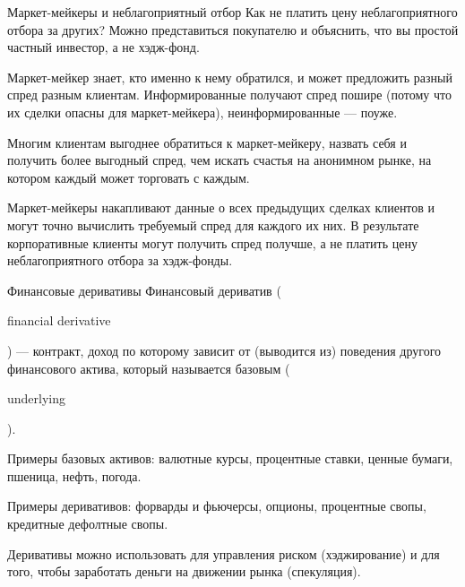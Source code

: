 \documentclass{beamer}
\newcommand{\en}[1]{\begin{otherlanguage}{english}#1\end{otherlanguage}}
\begin{document}
\begin{frame}{Маркет-мейкеры и неблагоприятный отбор}
\justify
Как не платить цену неблагоприятного отбора за других? Можно 
представиться покупателю и объяснить, что вы простой частный инвестор, а не хэдж-фонд.

\justify
Маркет-мейкер знает, кто именно к нему обратился, и может предложить разный спред разным клиентам. Информированные получают спред пошире (потому что их сделки опасны для маркет-мейкера), неинформированные --- поуже.

\justify
Многим клиентам выгоднее обратиться к маркет-мейкеру, назвать себя и 
получить более выгодный спред, чем искать счастья на анонимном рынке, на котором
каждый может торговать с каждым.

\justify
Маркет-мейкеры накапливают данные о всех предыдущих сделках клиентов и
могут точно вычислить требуемый спред для каждого их них. В результате корпоративные клиенты могут получить спред получше, а не платить цену неблагоприятного отбора за хэдж-фонды.
\end{frame}



\begin{frame}{Финансовые деривативы}
\justify
\alert{Финансовый дериватив} (\en{financial derivative}) --- контракт, доход по которому зависит 
от (выводится из) поведения другого финансового актива, который называется базовым 
(\en{underlying}).

\justify
Примеры базовых активов: валютные курсы, процентные ставки, ценные бумаги, пшеница, нефть, погода.

\justify
Примеры деривативов: форварды и фьючерсы, опционы, процентные свопы, кредитные дефолтные свопы.

\justify
Деривативы можно использовать для управления риском (хэджирование) и для того, чтобы заработать деньги на движении рынка (спекуляция). 
\end{frame}
\end{document}
